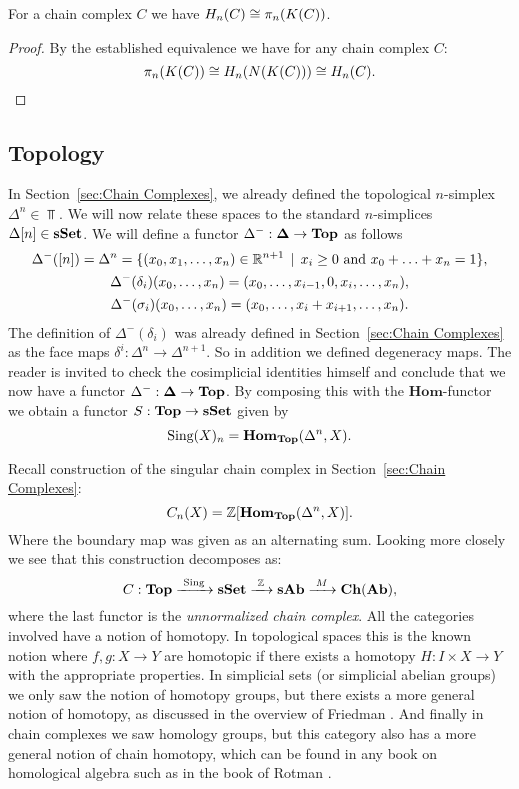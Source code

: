 \begin{corollary}
	For a chain complex $C$ we have $H_n(C) \cong \pi_n(K(C))$.
\end{corollary}
\begin{proof}
	By the established equivalence we have for any chain complex $C$:
	$$ \pi_n(K(C)) \cong H_n(N(K(C))) \cong H_n(C). $$
\end{proof}

\subsection{Topology}
In Section~\ref{sec:Chain Complexes}, we already defined the topological $n$-simplex $\Delta^n \in \Top$. We will now relate these spaces to the standard $n$-simplices $\Delta[n] \in \mathbf{sSet}$. We will define a functor $\Delta^-: \mathbf{\Delta} \to \mathbf{Top}$ as follows
\begin{gather*}
	\Delta^-([n]) = \Delta^n = \{(x_0, x_1, \ldots, x_n) \in \mathbb{R}^{n+1} \,\mid\, x_i \geq 0 \text{ and } x_0 + \ldots + x_n = 1 \}, \\
	\Delta^-(\delta_i) (x_0, \ldots, x_n) = (x_0, \ldots, x_{i-1}, 0, x_{i}, \ldots, x_n), \\
	\Delta^-(\sigma_i) (x_0, \ldots, x_n) = (x_0, \ldots, x_{i} + x_{i+1}, \ldots, x_n).
\end{gather*}
The definition of $\Delta^-(\delta_i)$ was already defined in Section~\ref{sec:Chain Complexes} as the face maps $\delta^i: \Delta^n \to \Delta^{n+1}$. So in addition we defined degeneracy maps. The reader is invited to check the cosimplicial identities himself and conclude that we now have a functor $\Delta^-: \mathbf{\Delta} \to \mathbf{Top}$. By composing this with the $\mathbf{Hom}$-functor we obtain a functor $S: \mathbf{Top} \to \mathbf{sSet}$ given by
$$ \text{Sing}(X)_n = \mathbf{Hom}_{\mathbf{Top}}(\Delta^n, X). $$

Recall construction of the singular chain complex in Section~\ref{sec:Chain Complexes}:
$$ C_n(X) = \mathbb{Z}[\mathbf{Hom}_{\mathbf{Top}}(\Delta^n, X)]. $$
Where the boundary map was given as an alternating sum. Looking more closely we see that this construction decomposes as:
$$ C: \mathbf{Top} \xrightarrow{\,\,{\text{Sing}}\,\,} \mathbf{sSet} \xrightarrow{\,\,{\mathbb{Z}}\,\,} \mathbf{sAb} \xrightarrow{\,\,{M}\,\,} \mathbf{Ch}(\mathbf{Ab}), $$
where the last functor is the \emph{unnormalized chain complex}. All the categories involved have a notion of homotopy. In topological spaces this is the known notion where $f, g:X \to Y$ are homotopic if there exists a homotopy $H:I \times X \to Y$ with the appropriate properties. In simplicial sets (or simplicial abelian groups) we only saw the notion of homotopy groups, but there exists a more general notion of homotopy, as discussed in the overview of Friedman \cite{friedman}. And finally in chain complexes we saw homology groups, but this category also has a more general notion of chain homotopy, which can be found in any book on homological algebra such as in the book of Rotman \cite{rotman}.

